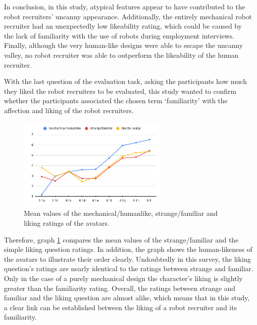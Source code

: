 In conclusion, in this study, atypical features appear to have contributed to the robot recruiters' uncanny appearance. Additionally, the entirely mechanical robot recruiter had an unexpectedly low likeability rating, which could be caused by the lack of familiarity with the use of robots during employment interviews. Finally, although the very human-like designs were able to escape the uncanny valley, no robot recruiter was able to outperform the likeability of the human recruiter.\par
With the last question of the evaluation task, asking the participants how much they liked the robot recruiters to be evaluated, this study wanted to confirm whether the participants associated the chosen term `familiarity' with the affection and liking of the robot recruiters. 
\begin{figure} %
    \centering
    \includegraphics[width=0.65\textwidth]{graphics/result/result4.png}
    \caption{Mean values of the mechanical/humanlike, strange/familiar and liking ratings of the avatars.}
    \label{fig:likeability}
\end{figure}
Therefore, graph \ref{fig:likeability} compares the mean values of the strange/familiar and the simple liking question ratings. In addition, the graph shows the human-likeness of the avatars to illustrate their order clearly. Undoubtedly in this survey, the liking question's ratings are nearly identical to the ratings between strange and familiar. Only in the case of a purely mechanical design the character's liking is slightly greater than the familiarity rating. Overall, the ratings between strange and familiar and the liking question are almost alike, which means that in this study, a clear link can be established between the liking of a robot recruiter and its familiarity.\\
